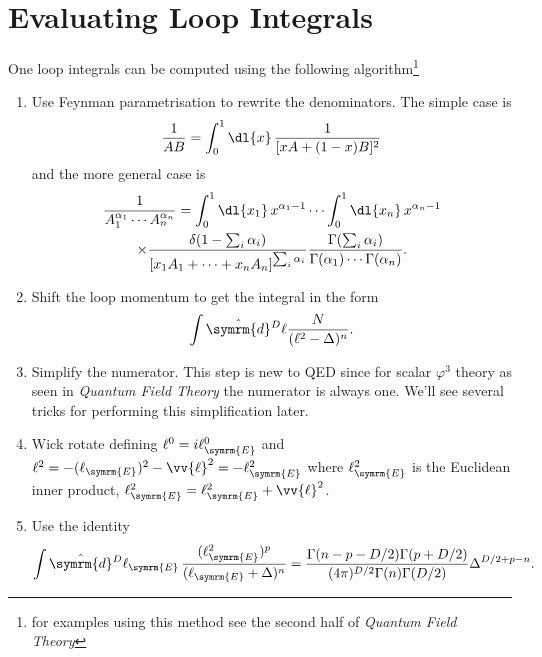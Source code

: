 \documentclass[fleqn]{NotesClass}
\newcommand*{\course}[1]{\textit{#1}}
\newcommand{\dhat}[1]{\hat{\symrm{d}}{#1}}
\begin{document}
    \chapter{Evaluating Loop Integrals}
    One loop integrals can be computed using the following algorithm\footnote{for examples using this method see the second half of \course{Quantum Field Theory}}
    \begin{enumerate}
        \item Use Feynman parametrisation to rewrite the denominators.
        The simple case is
        \begin{equation}
            \frac{1}{AB} = \int_0^1 \dl{x} \, \frac{1}{[xA + (1 - x)B]^2}
        \end{equation}
        and the more general case is
        \begin{multline*}
            \frac{1}{A_1^{\alpha_1} \dotsm A_n^{\alpha_n}} = \int_0^1 \dl{x_1} \, x^{\alpha_1 - 1} \dotsm \int_0^1 \dl{x_n} \, x^{\alpha_n - 1}\\
            \times \frac{\delta(1 - \sum_i \alpha_i)}{[x_1 A_1 + \dotsb + x_n A_n]^{\sum_i \alpha_i}} \frac{\Gamma(\sum_i \alpha_i)}{\Gamma(\alpha_1) \dotsm \Gamma(\alpha_n)}.
        \end{multline*}
        \item Shift the loop momentum to get the integral in the form
        \begin{equation}
            \int \dhat{^D\ell} \frac{N}{(\ell^2 - \Delta)^n}.
        \end{equation}
        \item Simplify the numerator. This step is new to QED since for scalar \(\varphi^3\) theory as seen in \course{Quantum Field Theory} the numerator is always one.
        We'll see several tricks for performing this simplification later.
        \item Wick rotate defining \(\ell^0 = i\ell^0_{\symrm{E}}\) and \(\ell^2 = -(\ell_{\symrm{E}})^2 - \vv{\ell}^2 = -\ell_{\symrm{E}}^2\) where \(\ell_{\symrm{E}}^2\) is the Euclidean inner product, \(\ell_{\symrm{E}}^2 = \ell_{\symrm{E}}^2 + \vv{\ell}^2\).
        \item Use the identity
        \begin{equation}
            \int \dhat{^D\ell_{\symrm{E}}} \, \frac{(\ell_{\symrm{E}}^2)^p}{(\ell_{\symrm{E}} + \Delta)^n} = \frac{\Gamma(n - p - D/2)\Gamma(p + D/2)}{(4\pi)^{D/2}\Gamma(n)\Gamma(D/2)} \Delta^{D/2 + p - n}.
        \end{equation}
    \end{enumerate}
    
\end{document}
